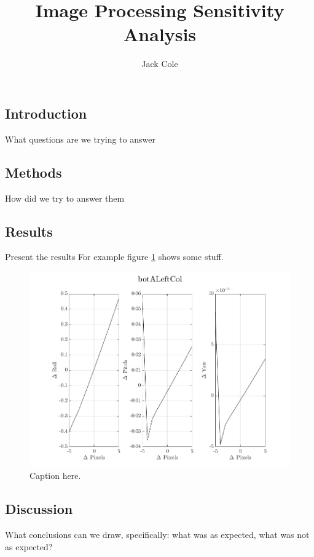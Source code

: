 \documentclass[12pt]{article}
\title{Image Processing Sensitivity Analysis}
\author{Jack Cole}
\date{}
\begin{document}
	
\maketitle

\begin{multicols}{2}
\section{Introduction}
What questions are we trying to answer
\subsection{Methods}
How did we try to answer them
\subsection{Results}
Present the results
For example figure \ref{fig:botALeftCol} shows some stuff.
\begin{figure}[H]
	\includegraphics[width=0.9\columnwidth]{botALeftCol.png}
	\caption{Caption here.\label{fig:botALeftCol}}
\end{figure}

\subsection{Discussion}
What conclusions can we draw, specifically: what was as expected, what was not as expected?

\end{multicols}
\end{document}
